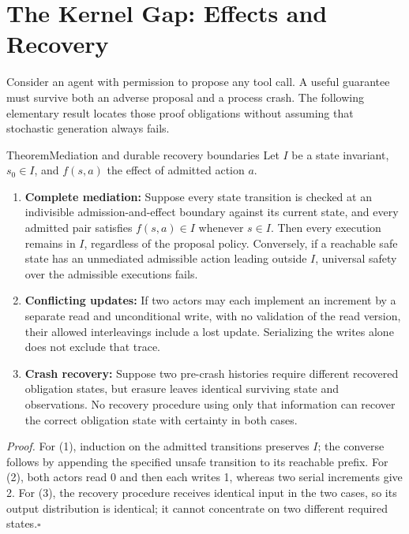 \section{The Kernel Gap: Effects and Recovery}\label{pre:sec:kernel-gap}

Consider an agent with permission to propose any tool call. A useful guarantee must survive both an adverse proposal and a process crash. The following elementary result locates those proof obligations without assuming that stochastic generation always fails.

\begin{pdclaim}{Theorem}{Mediation and durable recovery boundaries}\label{thm:kernel-gap}
Let $I$ be a state invariant, $s_0\in I$, and $f(s,a)$ the effect of admitted action $a$.
\begin{enumerate}[leftmargin=1.5em,itemsep=1.5pt]
  \item \textbf{Complete mediation:} Suppose every state transition is checked at an indivisible admission-and-effect boundary against its current state, and every admitted pair satisfies $f(s,a)\in I$ whenever $s\in I$. Then every execution remains in $I$, regardless of the proposal policy. Conversely, if a reachable safe state has an unmediated admissible action leading outside $I$, universal safety over the admissible executions fails.
  \item \textbf{Conflicting updates:} If two actors may each implement an increment by a separate read and unconditional write, with no validation of the read version, their allowed interleavings include a lost update. Serializing the writes alone does not exclude that trace.
  \item \textbf{Crash recovery:} Suppose two pre-crash histories require different recovered obligation states, but erasure leaves identical surviving state and observations. No recovery procedure using only that information can recover the correct obligation state with certainty in both cases.
\end{enumerate}
\end{pdclaim}
\noindent\textit{Proof.} For (1), induction on the admitted transitions preserves $I$; the converse follows by appending the specified unsafe transition to its reachable prefix. For (2), both actors read 0 and then each writes 1, whereas two serial increments give 2. For (3), the recovery procedure receives identical input in the two cases, so its output distribution is identical; it cannot concentrate on two different required states.\hfill$\square$

